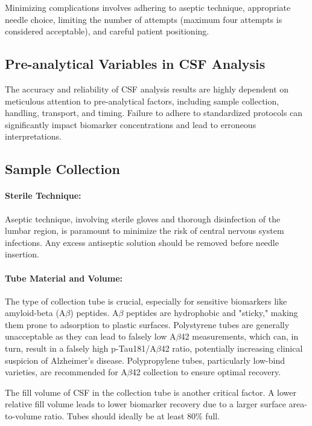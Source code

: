 Minimizing complications involves adhering to aseptic technique, appropriate needle choice, limiting the number of attempts (maximum four attempts is considered acceptable), and careful patient positioning.
	
\subsection{Pre-analytical Variables in CSF Analysis}
	
The accuracy and reliability of CSF analysis results are highly dependent on meticulous attention to pre-analytical factors, including sample collection, handling, transport, and timing. Failure to adhere to standardized protocols can significantly impact biomarker concentrations and lead to erroneous interpretations.
	
\subsection{Sample Collection}
	
\paragraph{Sterile Technique:} Aseptic technique, involving sterile gloves and thorough disinfection of the lumbar region, is paramount to minimize the risk of central nervous system infections. Any excess antiseptic solution should be removed before needle insertion.
	
\paragraph{Tube Material and Volume:} The type of collection tube is crucial, especially for sensitive biomarkers like amyloid-beta (A$\beta$) peptides. A$\beta$ peptides are hydrophobic and "sticky," making them prone to adsorption to plastic surfaces. Polystyrene tubes are generally unacceptable as they can lead to falsely low A$\beta$42 measurements, which can, in turn, result in a falsely high p-Tau181/A$\beta$42 ratio, potentially increasing clinical suspicion of Alzheimer's disease. Polypropylene tubes, particularly low-bind varieties, are recommended for A$\beta$42 collection to ensure optimal recovery.
	
The fill volume of CSF in the collection tube is another critical factor. A lower relative fill volume leads to lower biomarker recovery due to a larger surface area-to-volume ratio. Tubes should ideally be at least 80\% full.
	
